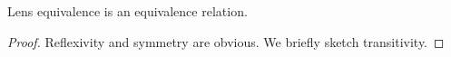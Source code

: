 \begin{defn}[$R$-similarity]
\iffull
\begin{lemma}
Lens equivalence is an equivalence relation.
\end{lemma}
\begin{proof}
Reflexivity and symmetry are obvious. We briefly sketch transitivity.



\end{proof}
\end{defn}
